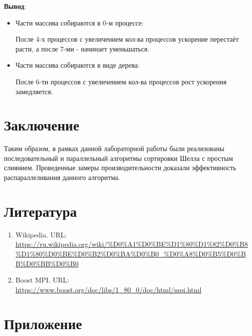 \documentclass{report}
\begin{document}
\textbf{Вывод}: 
    \begin{itemize}
        \item Части массива собираются в 0-м процессе: 
        \par После 4-х процессов с увеличением кол-ва процессов ускорение перестаёт расти, а после 7-ми - начинает уменьшаться.
        \item Части массива собираются в виде дерева:
        \par После 6-ти процессов с увеличением кол-ва процессов рост ускорения замедляется.
    \end{itemize}

\newpage

\section*{Заключение}
Таким образом, в рамках данной лабораторной работы были реализованы последовательный и параллельный алгоритмы сортировки Шелла с простым слиянием. Проведенные замеры производительности доказали эффективность распараллеливания данного алгоритма.
\newpage

\section*{Литература}
\begin{enumerate}
\item Wikipedia. URL: \newline \url{https://ru.wikipedia.org/wiki/%D0%A1%D0%BE%D1%80%D1%82%D0%B8%D1%80%D0%BE%D0%B2%D0%BA%D0%B0_%D0%A8%D0%B5%D0%BB%D0%BB%D0%B0}
\item Boost MPI. URL: \newline \url{https://www.boost.org/doc/libs/1_80_0/doc/html/mpi.html}
\end{enumerate}


\newpage

\section*{Приложение}
\end{document}
